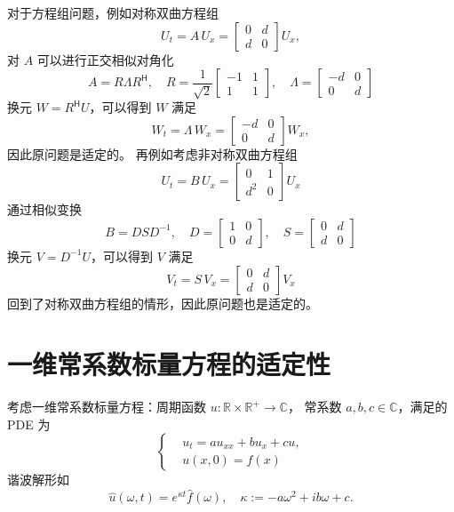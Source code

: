 对于方程组问题，例如对称双曲方程组
\[
    U_t = A\,U_x =
    \begin{bmatrix}
        0 & d \\
        d & 0
    \end{bmatrix}
    U_x,
\]
对 $A$ 可以进行正交相似对角化
\[
    A = R \Lambda R^\mathsf{H},\quad
    R = \frac{1}{\sqrt{2}}
    \begin{bmatrix}
        -1 & 1 \\
        1  & 1
    \end{bmatrix},\quad
    \Lambda =
    \begin{bmatrix}
        -d & 0 \\
        0  & d
    \end{bmatrix}
\]
换元 $W  = R^\mathsf{H} U$，可以得到 $W$ 满足
\[
    W_t = \Lambda\,W_x =
    \begin{bmatrix}
        -d & 0 \\
        0  & d
    \end{bmatrix}
    W_x,
\]
因此原问题是适定的。
再例如考虑非对称双曲方程组
\[
    U_t = B\,U_x =
    \begin{bmatrix}
        0   & 1 \\
        d^2 & 0
    \end{bmatrix}
    U_x
\]
通过相似变换
\[
    B = D S D^{-1},\quad
    D =
    \begin{bmatrix}
        1 & 0 \\
        0 & d
    \end{bmatrix},\quad
    S =
    \begin{bmatrix}
        0 & d \\
        d & 0
    \end{bmatrix}
\]
换元 $V = D^{-1} U$，可以得到 $V$ 满足
\[
    V_t = S\,V_x =
    \begin{bmatrix}
        0 & d \\
        d & 0
    \end{bmatrix}
    V_x
\]
回到了对称双曲方程组的情形，因此原问题也是适定的。

\section{一维常系数标量方程的适定性}

考虑一维常系数标量方程：周期函数 $u: \mathbb{R} \times \mathbb{R}^+ \to \mathbb{C}$，
常系数 $a,b,c \in \mathbb{C}$，满足的 PDE 为
\begin{equation}
    \left\{
    \begin{aligned}
         & u_t = a u_{xx} + b u_x + c u, \\
         & u(x,0) = f(x)
    \end{aligned}
    \right.
    \label{eq:1d-pde-scalar}
\end{equation}
谐波解形如
\[
    \hat{u}(\omega,t) = e^{\kappa t} \hat{f}(\omega), \quad  \kappa := -a \omega ^2 + i b \omega  + c.
\]

